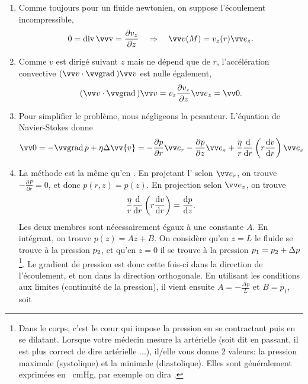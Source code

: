 \documentclass[12pt,fancy]{cours}
\begin{document}
\begin{enumerate}
	\item Comme toujours pour un fluide newtonien, on suppose l’écoulement incompressible,
\begin{equation}
	0 = \Dive{\Vec{v}} = \dr{v_z}{z} \Rar \Vec{v}(M) = v_z(r)\ez.
\end{equation}
\item  Comme $v$ est dirigé suivant $z$ mais ne dépend que de $r$, l’accélération convective $(\Vec{v}\cdot \Grad{})\Vec{v}$ est nulle également,
\begin{equation}
	(\Vec{v}\cdot \Grad{})\Vec{v} = v_z\dr{v_z}{z} \ez = \Vec{0}.
\end{equation}
\item
  Pour simplifier le problème, nous négligeons la pesanteur.  L'équation de Navier-Stokes donne
\begin{equation}\label{eq:ns_pois}
 \Vec{0} = -\grad{p}+\eta\Delta\vv{v} = -\dr{p}{r}\er - \dr{p}{z}\ez + \frac{\eta}{r}\frac{\d}{\d r}\left(r\frac{\d v}{\d r}\right)  \ez
 \end{equation}

\item La méthode est la même qu’en .
En projetant l’ selon $\er$, on trouve $-\frac{\partial P}{\partial r}=0$, et donc $p(r,z)=p(z)$. En projection selon $\ez$, on trouve
\begin{equation}\label{eq:visq_pois}
\frac{\eta}{r}\frac{\mathrm{d}}{\mathrm{d} r}\left(r\frac{\mathrm{d} v}{\mathrm{d} r}\right) = \frac{\mathrm{d}{p}}{\mathrm{d}{z}}.
\end{equation}
Les deux membres sont nécessairement égaux à une constante $A$. En intégrant, on trouve $p(z)=Az+B$. On considère qu'en $z=L$ le fluide se trouve à la pression $p_{\rm{2}}$, et qu'en $z=0$ il se trouve à la pression $p_{\rm{1}}=p_2+\Delta p$\footnote{Dans le corps, c'est le cœur qui impose la pression en se contractant puis en se dilatant. Lorsque votre médecin mesure la  artérielle (soit dit en passant, il est plus correct de dire  artérielle ...), il/elle vous donne 2 valeurs: la pression maximale (systolique) et la minimale (diastolique). Elles sont généralement exprimées en \SI{}{cmHg}, par exemple on dira .}. Le gradient de pression est donc cette fois-ci dans la direction de l’écoulement, et non dans la direction orthogonale. En utilisant les conditions aux limites (continuité de la pression), il vient ensuite $A= -\frac{\Delta p}{L}$ et $B=p_1$, soit


\end{enumerate}
\end{document}
